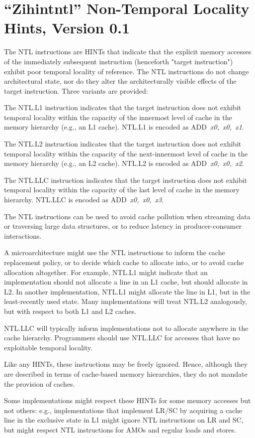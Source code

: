 \chapter{``Zihintntl'' Non-Temporal Locality Hints, Version 0.1}
\label{chap:zihintpause}

The NTL instructions are HINTs that indicate that the explicit memory accesses of the immediately subsequent
instruction (henceforth "target instruction") exhibit poor temporal locality of reference.
The NTL instructions do not change architectural state, nor do they alter the
architecturally visible effects of the target instruction.
Three variants are provided:

The NTL.L1 instruction indicates that the target instruction
does not exhibit temporal locality within the capacity of the innermost level
of cache in the memory hierarchy (e.g., an L1 cache).
NTL.L1 is encoded as \mbox{ADD {\em x0, x0, x1}}.

The NTL.L2 instruction indicates that the target instruction
does not exhibit temporal locality within the capacity of the next-innermost
level of cache in the memory hierarchy (e.g., an L2 cache).
NTL.L2 is encoded as \mbox{ADD {\em x0, x0, x2}}.

The NTL.LLC instruction indicates that the target
instruction does not exhibit temporal locality within the capacity of the last
level of cache in the memory hierarchy.
NTL.LLC is encoded as \mbox{ADD {\em x0, x0, x3}}.

\begin{commentary}
The NTL instructions can be used to avoid cache pollution when streaming data
or traversing large data structures, or to reduce latency in producer-consumer
interactions.

A microarchitecture might use the NTL instructions to inform the cache
replacement policy, or to decide which cache to allocate into, or to avoid
cache allocation altogether.
For example, NTL.L1 might indicate that an implementation should not allocate
a line in an L1 cache, but should allocate in L2.
In another implementation, NTL.L1 might allocate the line in L1, but in
the least-recently used state.
Many implementations will treat NTL.L2 analogously, but with respect to both
L1 and L2 caches.

NTL.LLC will typically inform implementations not to allocate anywhere in the
cache hierarchy.
Programmers should use NTL.LLC for accesses that have no exploitable temporal
locality.

Like any HINTs, these instructions may be freely ignored.
Hence, although they are described in terms of cache-based memory hierarchies,
they do not mandate the provision of caches.

Some implementations might respect these HINTs for some memory accesses but
not others: e.g., implementations that implement LR/SC by acquiring a
cache line in the exclusive state in L1 might ignore NTL instructions
on LR and SC, but might respect NTL instructions for
AMOs and regular loads and stores.
\end{commentary}

